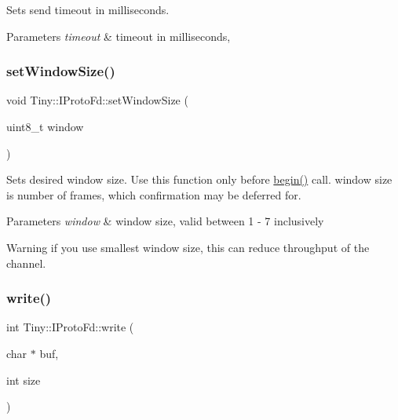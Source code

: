 Sets send timeout in milliseconds. 
\begin{DoxyParams}{Parameters}
{\em timeout} & timeout in milliseconds, \\
\hline
\end{DoxyParams}
\mbox{\label{classTiny_1_1IProtoFd_adddcc24bf1ef40d39c944679a97c1ec4}} 
\subsubsection{\texorpdfstring{set\+Window\+Size()}{setWindowSize()}}
{\footnotesize\ttfamily void Tiny\+::\+I\+Proto\+Fd\+::set\+Window\+Size (\begin{DoxyParamCaption}\item[{uint8\+\_\+t}]{window }\end{DoxyParamCaption})\hspace{0.3cm}{\ttfamily [inline]}}

Sets desired window size. Use this function only before \hyperlink{classTiny_1_1IProtoFd_a33f836591bf981b484d495d678d02442}{begin()} call. window size is number of frames, which confirmation may be deferred for. 
\begin{DoxyParams}{Parameters}
{\em window} & window size, valid between 1 -\/ 7 inclusively \\
\hline
\end{DoxyParams}
\begin{DoxyWarning}{Warning}
if you use smallest window size, this can reduce throughput of the channel. 
\end{DoxyWarning}
\mbox{\label{classTiny_1_1IProtoFd_adea59df6702e16fd986a91c7ee62012a}} 
\subsubsection{\texorpdfstring{write()}{write()}\hspace{0.1cm}{\footnotesize\ttfamily [1/2]}}
{\footnotesize\ttfamily int Tiny\+::\+I\+Proto\+Fd\+::write (\begin{DoxyParamCaption}\item[{char $\ast$}]{buf,  }\item[{int}]{size }\end{DoxyParamCaption})}

